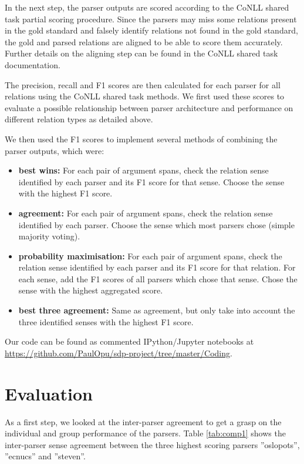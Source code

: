 \documentclass[10pt,notitlepage]{scrartcl}
\begin{document}
In the next step, the parser outputs are scored according to the CoNLL shared task partial scoring procedure. Since the parsers may miss some relations present in the gold standard and falsely identify relations not found in the gold standard, the gold and parsed relations are aligned to be able to score them accurately. Further details on the aligning step can be found in the CoNLL shared task documentation.

The precision, recall and F1 scores are then calculated for each parser for all relations using the CoNLL shared task methods. We first used these scores to evaluate a possible relationship between parser architecture and performance on different relation types as detailed above.

We then used the F1 scores to implement several methods of combining the parser outputs, which were:
\begin{itemize}
\item \textbf{best wins:} For each pair of argument spans, check the relation sense identified by each parser and its F1 score for that sense. Choose the sense with the highest F1 score.
\item \textbf{agreement:} For each pair of argument spans, check the relation sense identified by each parser. Choose the sense which most parsers chose (simple majority voting).
\item \textbf{probability maximisation:} For each pair of argument spans, check the relation sense identified by each parser and its F1 score for that relation. For each sense, add the F1 scores of all parsers which chose that sense. Chose the sense with the highest aggregated score.
\item \textbf{best three agreement:} Same as agreement, but only take into account the three identified senses with the highest F1 score.
\end{itemize}

Our code can be found as commented IPython/Jupyter notebooks at \url{https://github.com/PaulOpu/sdp-project/tree/master/Coding}.

\pagebreak
\section*{Evaluation}
As a first step, we looked at the inter-parser agreement to get a grasp on the individual and group performance of the parsers. Table \ref{tab:comp1} shows the inter-parser sense agreement between the three highest scoring parsers ''oslopots'', ''ecnucs'' and ''steven''.
\end{document}

